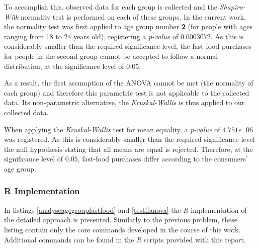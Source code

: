 \documentclass[12pt]{article}
\begin{document}
To accomplish this, observed data for each group is collected and the \emph{Shapiro-Wilk} normality test is performed on each of these groups. In the current work, the normality test was first applied to age group number \textbf{2} (for people with ages ranging from 18 to 24 years old), registering a \emph{p-value} of $0.0003072$. As this is considerably smaller than the required significance level, the fast-food purchases for people in the second group cannot be accepted to follow a normal distribution, at the significance level of $0.05$.

As a result, the first assumption of the ANOVA cannot be met (the normality of each group) and therefore this parametric test is not applicable to the collected data. Its non-parametric alternative, the \emph{Kruskal-Wallis} is thus applied to our collected data.

When applying the \emph{Kruskal-Wallis} test for mean equality, a \emph{p-value} of $4.751e^-{06}$ was registered. As this is considerably smaller than the required significance level the null hypothesis stating that all means are equal is rejected. Therefore, at the significance level of $0.05$, fast-food purchases differ according to the consumers' age group.

\subsubsection{R Implementation}

In listings \ref{analyseagegroupfastfood} and \ref{testifanova} the \emph{R} implementation of the detailed approach is presented. Similarly to the previous problem, these listing contain only the core commands developed in the course of this work. Additional commands can be found in the \emph{R} scripts provided with this report.
\end{document}
